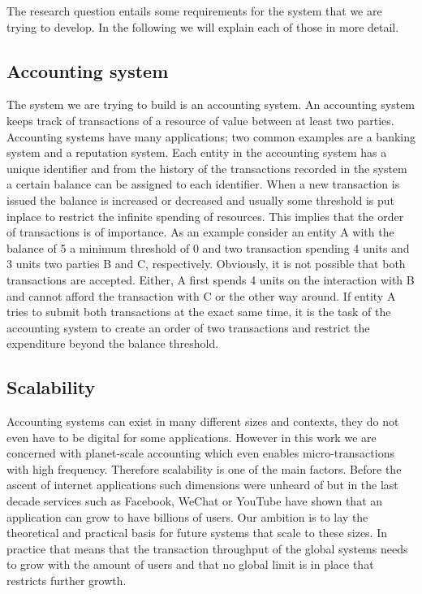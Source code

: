 The research question entails some requirements for the system that we are trying to develop. In 
the following we will explain each of those in more detail.


\subsection{Accounting system}
\label{sec:accounting_system}
The system we are trying to build is an accounting system. An accounting system keeps track of 
transactions of a resource of value between at least two parties. Accounting systems have many 
applications; two common examples are a banking system and a reputation system. Each entity in 
the accounting system has a unique identifier and from the history of the transactions recorded 
in the system a certain balance can be assigned to each identifier. When a new transaction is issued 
the balance is increased or decreased and usually some threshold is put inplace to restrict the 
infinite spending of resources. This implies that the order of transactions is of importance. As an 
example consider an entity A with the balance of 5 a minimum threshold of 0 and two transaction 
spending 4 units and 3 units two parties B and C, respectively. Obviously, it is not possible that
both transactions are accepted. Either, A first spends 4 units on the interaction with B and cannot
afford the transaction with C or the other way around. If entity A tries to submit both transactions
at the exact same time, it is the task of the accounting system to create an order of two transactions
and restrict the expenditure beyond the balance threshold.

\subsection{Scalability}
Accounting systems can exist in many different sizes and contexts, they do not even have to be
digital for some applications. However in this work we are concerned with planet-scale accounting
which even enables micro-transactions with high frequency. Therefore scalability is one of the 
main factors. Before the ascent of internet applications such dimensions were unheard of but in
the last decade services such as Facebook, WeChat or YouTube have shown that an application can 
grow to have billions of users. Our ambition is to lay the theoretical and practical basis for 
future systems that scale to these sizes. In practice that means that the transaction throughput
of the global systems needs to grow with the amount of users and that no global limit is in place
that restricts further growth.

